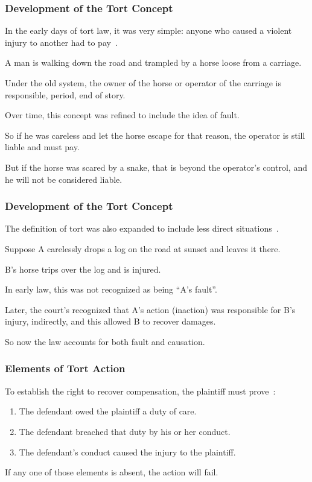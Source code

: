 \begin{frame}
\frametitle{Development of the Tort Concept}

In the early days of tort law, it was very simple: anyone who caused a violent injury to another had to pay~\cite{lba}.

A man is walking down the road and trampled by a horse loose from a carriage.

Under the old system, the owner of the horse or operator of the carriage is responsible, period, end of story.

Over time, this concept was refined to include the idea of \alert{fault}. 

So if he was careless and let the horse escape for that reason, the operator is still liable and must pay.

But if the horse was scared by a snake, that is beyond the operator's control, and he will not be considered liable.

\end{frame}



\begin{frame}
\frametitle{Development of the Tort Concept}

The definition of tort was also expanded to include less direct situations~\cite{lba}.


Suppose A carelessly drops a log on the road at sunset and leaves it there.

B's horse trips over the log and is injured.

In early law, this was not recognized as being ``A's fault''.

Later, the court's recognized that A's action (inaction) was responsible for B's injury, indirectly, and this allowed B to recover damages.

So now the law accounts for both fault and \alert{causation}.

\end{frame}


\begin{frame}
\frametitle{Elements of Tort Action}

To establish the right to recover compensation, the plaintiff must prove~\cite{lpe}:

\begin{enumerate}
	\item The defendant owed the plaintiff a duty of care.
	\item The defendant breached that duty by his or her conduct.
	\item The defendant's conduct caused the injury to the plaintiff.
\end{enumerate}

If any one of those elements is absent, the action will fail.

\end{frame}




